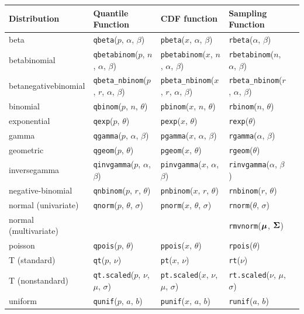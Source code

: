 \documentclass[12pt]{article}
\begin{document}
\begin{table}[htp]
\centering
\small
\begin{tabular}{l | llll}
Distribution & Quantile Function & CDF function & Sampling Function \\ \hline
beta & \texttt{qbeta}($p$, $\alpha$, $\beta$) & \texttt{pbeta}($x$, $\alpha$, $\beta$) & \texttt{rbeta}($\alpha$, $\beta$) \\
betabinomial & \texttt{qbetabinom}($p$, $n$, $\alpha$, $\beta$) & \texttt{pbetabinom}($x$, $n$, $\alpha$, $\beta$) & \texttt{rbetabinom}($n$, $\alpha$, $\beta$) \\
betanegativebinomial & \texttt{qbeta\_nbinom}($p$, $r$, $\alpha$, $\beta$) & \texttt{pbeta\_nbinom}($x$, $r$, $\alpha$, $\beta$) & \texttt{rbeta\_nbinom}($r$, $\alpha$, $\beta$) \\
binomial & \texttt{qbinom}($p$, $n$, $\theta$) & \texttt{pbinom}($x$, $n$, $\theta$) & \texttt{rbinom}($n$, $\theta$) \\
exponential & \texttt{qexp}($p$, $\theta$) & \texttt{pexp}($x$, $\theta$) & \texttt{rexp}($\theta$) \\
gamma & \texttt{qgamma}($p$, $\alpha$, $\beta$) & \texttt{pgamma}($x$, $\alpha$, $\beta$) & \texttt{rgamma}($\alpha$, $\beta$) \\
geometric & \texttt{qgeom}($p$, $\theta$) & \texttt{pgeom}($x$, $\theta$) & \texttt{rgeom}($\theta$) \\
inversegamma & \texttt{qinvgamma}($p$, $\alpha$, $\beta$) & \texttt{pinvgamma}($x$, $\alpha$, $\beta$) & \texttt{rinvgamma}($\alpha$, $\beta$) \\
negative-binomial & \texttt{qnbinom}($p$, $r$, $\theta$) & \texttt{pnbinom}($x$, $r$, $\theta$) & \texttt{rnbinom}($r$, $\theta$) \\
normal (univariate) & \texttt{qnorm}($p$, $\theta$, $\sigma$) & \texttt{pnorm}($x$, $\theta$, $\sigma$) & \texttt{rnorm}($\theta$, $\sigma$) \\
normal (multivariate) & & & \texttt{rmvnorm}($\boldsymbol{\mu}$, $\boldsymbol{\Sigma}$) \\
poisson & \texttt{qpois}($p$, $\theta$) & \texttt{ppois}($x$, $\theta$) & \texttt{rpois}($\theta$) \\
T (standard) & \texttt{qt}($p$, $\nu$) & \texttt{pt}($x$, $\nu$) & \texttt{rt}($\nu$) \\
T (nonstandard) & \texttt{qt.scaled}($p$, $\nu$, $\mu$, $\sigma$) & \texttt{pt.scaled}($x$, $\nu$, $\mu$, $\sigma$) & \texttt{rt.scaled}($\nu$, $\mu$, $\sigma$) \\
uniform & \texttt{qunif}($p$, $a$, $b$) & \texttt{punif}($x$, $a$, $b$) & \texttt{runif}($a$, $b$) \\



\end{tabular}
\end{table}
\end{document}
